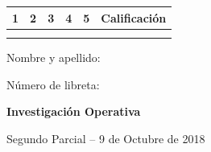 \documentclass[a4paper,oneside,12pt]{amsart}
\newcommand{\nombremateria}
{Investigaci\'on Operativa}
\newcommand{\numeroparcial}
    { Segundo Parcial }
\newcommand{\fecha}
    {9 de Octubre de 2018}
\begin{document}
\hfill \hfill
\begin{tabular}[c]{|c|c|c|c|c|c|}
\hline 
1 & 2 & 3 & 4 & 5 & Calificaci\'on \\ \hline \hline
\hspace{1 cm} & \hspace{1 cm} & \hspace{1 cm} & \hspace{1 cm} & \hspace{1 cm} & \hspace{1.3 cm} \\
\hspace{1 cm} & \hspace{1  cm} & \hspace{1  cm} & \hspace{1  cm} & \hspace{1  cm} & \hspace{1.3 cm} \\ \hline

\end{tabular}

\vspace{-1cm}

\noindent Nombre y apellido:

\vspace{0.2cm}

\noindent Número de libreta:

\noindent \hrulefill 

\smallskip
\renewcommand{\baselinestretch}{1.1}

\begin{center}
	\large \textbf{\nombremateria} 
	
	\numeroparcial -- \fecha
\end{center}

\vspace{.6cm}
\renewcommand{\theenumi}{\textbf{\arabic{enumi}}}

\end{document}
